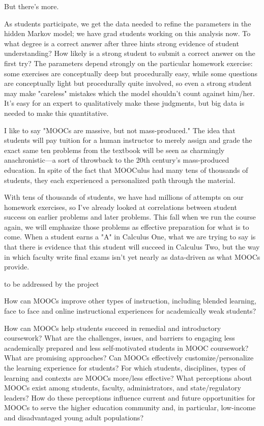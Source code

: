 \documentclass[12pt]{article}
\begin{document}
But there's more.

As students participate, we get the data needed to refine the
parameters in the hidden Markov model; we have grad students working
on this analysis now.  To what degree is a correct answer after three
hints strong evidence of student understanding?  How likely is a
strong student to submit a correct answer on the first try?  The
parameters depend strongly on the particular homework exercise: some
exercises are conceptually deep but procedurally easy, while some
questions are conceptually light but procedurally quite involved, so
even a strong student may make "careless" mistakes which the model
shouldn't count against him/her.  It's easy for an expert to
qualitatively make these judgments, but big data is needed to make
this quantitative.

I like to say "MOOCs are massive, but not mass-produced."  The idea
that students will pay tuition for a human instructor to merely assign
and grade the exact same ten problems from the textbook will be seen
as charmingly anachronistic---a sort of throwback to the 20th
century's mass-produced education.  In spite of the fact that MOOCulus
had many tens of thousands of students, they each experienced a
personalized path through the material.

With tens of thousands of students, we have had millions of attempts
on our homework exercises, so I've already looked at correlations
between student success on earlier problems and later problems.  This
fall when we run the course again, we will emphasize those problems as
effective preparation for what is to come.  When a student earns a "A"
in Calculus One, what we are trying to say is that there is evidence
that this student will succeed in Calculus Two, but the way in which
faculty write final exams isn't yet nearly as data-driven as what
MOOCs provide.

to be addressed by the project

How can MOOCs improve other types of instruction, including blended
learning, face to face and online instructional experiences for
academically weak students?

How can MOOCs help students succeed in remedial and introductory
coursework?  What are the challenges, issues, and barriers to engaging
less academically prepared and less self-motivated students in MOOC
coursework? What are promising approaches?  Can MOOCs effectively
customize/personalize the learning experience for students?  For which
students, disciplines, types of learning and contexts are MOOCs
more/less effective?  What perceptions about MOOCs exist among
students, faculty, administrators, and state/regulatory leaders? How
do these perceptions influence current and future opportunities for
MOOCs to serve the higher education community and, in particular,
low-income and disadvantaged young adult populations?
\end{document}
